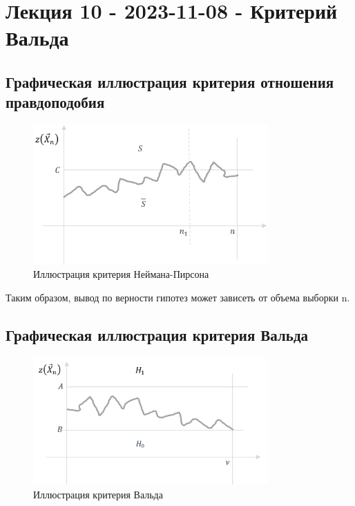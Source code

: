 \section{Лекция 10 - 2023-11-08 - Критерий Вальда}
\subsection{Графическая иллюстрация критерия отношения правдоподобия}

\begin{figure}[h!]
  \centering
  \includegraphics[width=0.8\textwidth]{Figures/10-plot1.png}
  \caption{Иллюстрация критерия Неймана-Пирсона}
  \label{fig:10-plot1}
\end{figure}

Таким образом, вывод по верности гипотез может зависеть от объема выборки n.

\subsection{Графическая иллюстрация критерия Вальда}

\begin{figure}[h!]
  \centering
  \includegraphics[width=0.8\textwidth]{Figures/10-plot2.png}
  \caption{Иллюстрация критерия Вальда}
  \label{fig:10-plot2}
\end{figure}

